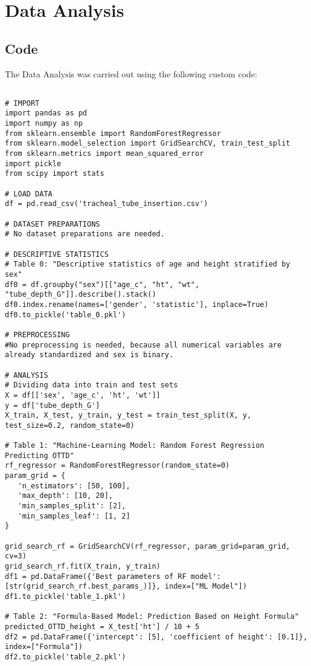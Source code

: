 \documentclass[11pt]{article}
\begin{document}
\section{Data Analysis}
\subsection{{Code}}
The Data Analysis was carried out using the following custom code:

\begin{verbatim}

# IMPORT
import pandas as pd
import numpy as np
from sklearn.ensemble import RandomForestRegressor
from sklearn.model_selection import GridSearchCV, train_test_split
from sklearn.metrics import mean_squared_error
import pickle
from scipy import stats

# LOAD DATA
df = pd.read_csv('tracheal_tube_insertion.csv')

# DATASET PREPARATIONS
# No dataset preparations are needed.

# DESCRIPTIVE STATISTICS
# Table 0: "Descriptive statistics of age and height stratified by sex"
df0 = df.groupby("sex")[["age_c", "ht", "wt", "tube_depth_G"]].describe().stack()
df0.index.rename(names=['gender', 'statistic'], inplace=True)
df0.to_pickle('table_0.pkl')

# PREPROCESSING 
#No preprocessing is needed, because all numerical variables are already standardized and sex is binary.

# ANALYSIS
# Dividing data into train and test sets
X = df[['sex', 'age_c', 'ht', 'wt']]
y = df['tube_depth_G']
X_train, X_test, y_train, y_test = train_test_split(X, y, test_size=0.2, random_state=0)

# Table 1: "Machine-Learning Model: Random Forest Regression Predicting OTTD"
rf_regressor = RandomForestRegressor(random_state=0)
param_grid = {
   'n_estimators': [50, 100],
   'max_depth': [10, 20],
   'min_samples_split': [2],
   'min_samples_leaf': [1, 2]
}

grid_search_rf = GridSearchCV(rf_regressor, param_grid=param_grid, cv=3)
grid_search_rf.fit(X_train, y_train)
df1 = pd.DataFrame({'Best parameters of RF model': [str(grid_search_rf.best_params_)]}, index=["ML Model"])
df1.to_pickle('table_1.pkl')

# Table 2: "Formula-Based Model: Prediction Based on Height Formula"
predicted_OTTD_height = X_test['ht'] / 10 + 5
df2 = pd.DataFrame({'intercept': [5], 'coefficient of height': [0.1]}, index=["Formula"])
df2.to_pickle('table_2.pkl')


\end{verbatim}
\end{document}
